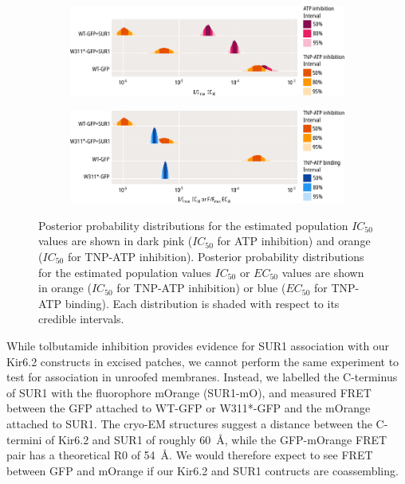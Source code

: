 \begin{figure}[hbtp]
	\centering
	\begin{subfigure}[t]{0.9\textwidth}
		\caption{}\label{ch6fig:nosur_ec50s}
		\centering
		\includegraphics[width=\textwidth]{nosur_ec50s.pdf}
	\end{subfigure}
	\vfill
	\begin{subfigure}[t]{0.9\textwidth}
		\caption{}\label{ch6fig:nosur_ec50s_2}
		\centering
		\includegraphics[width=\textwidth]{nosur_ec50s_2.pdf}
	\end{subfigure}
	\caption[SUR1 $EC_{50}$ and $IC_{50}$ parameters]{
	{\bf{}}
	 Posterior probability distributions for the estimated population $IC_{50}$ values are shown in dark pink ($IC_{50}$ for ATP inhibition) and orange ($IC_{50}$ for TNP-ATP inhibition).
	 Posterior probability distributions for the estimated population values $IC_{50}$ or $EC_{50}$ values are shown in orange ($IC_{50}$ for TNP-ATP inhibition) or blue ($EC_{50}$ for TNP-ATP binding).
	Each distribution is shaded with respect to its credible intervals.
	}\label{ch6fig:no_sur_2}
\end{figure}

While tolbutamide inhibition provides evidence for SUR1 association with our Kir6.2 constructs in excised patches, we cannot perform the same experiment to test for association in unroofed membranes.
Instead, we labelled the C-terminus of SUR1 with the fluorophore mOrange (SUR1-mO), and measured FRET between the GFP attached to WT-GFP or W311*-GFP and the mOrange attached to SUR1.
The cryo-EM structures suggest a distance between the C-termini of Kir6.2 and SUR1 of roughly \SI{60}{\angstrom}, while the GFP-mOrange FRET pair has a theoretical R0 of \SI{54}{\angstrom}.
We would therefore expect to see FRET between GFP and mOrange if our Kir6.2 and SUR1 contructs are coassembling.

